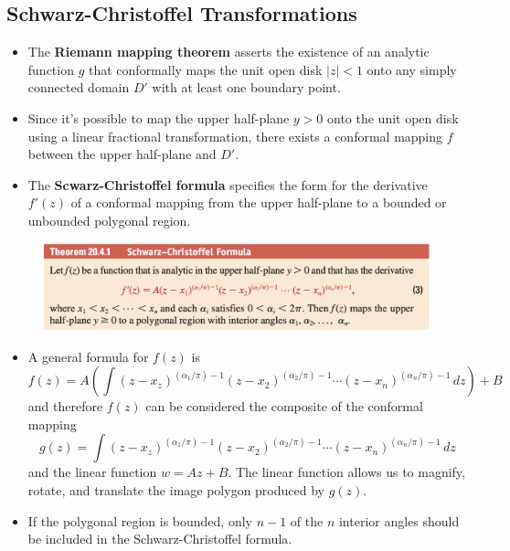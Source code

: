 \documentclass{article}
\begin{document}
\subsection{Schwarz-Christoffel Transformations}

\begin{itemize}
  \item The \textbf{Riemann mapping theorem} asserts the existence of an analytic function $g$ that conformally maps the unit open disk $|z| < 1$ onto any simply connected domain $D'$ with at least one boundary point.

  \item Since it's possible to map the upper half-plane $y > 0$ onto the unit open disk using a linear fractional transformation, there exists a conformal mapping $f$ between the upper half-plane and $D'$.

  \item The \textbf{Scwarz-Christoffel formula} specifies the form for the derivative $f'(z)$ of a conformal mapping from the upper half-plane to a bounded or unbounded polygonal region.
\end{itemize}

\begin{figure}[H]
  \centering
  \includegraphics[width=\textwidth]{schwarz-christoffel-formula}
\end{figure}

\begin{itemize}
  \item A general formula for $f(z)$ is \[f(z) = A \left( \int (z - x_z)^{(\alpha_1 / \pi) - 1} (z - x_2)^{(\alpha_2 / \pi) - 1} \cdots (z - x_n)^{(\alpha_n / \pi) - 1} \,d z \right) + B\] and therefore $f(z)$ can be considered the composite of the conformal mapping \[g(z) = \int (z - x_z)^{(\alpha_1 / \pi) - 1} (z - x_2)^{(\alpha_2 / \pi) - 1} \cdots (z - x_n)^{(\alpha_n / \pi) - 1} \,d z\] and the linear function $w = A z + B$. The linear function allows us to magnify, rotate, and translate the image polygon produced by $g(z)$.

  \item If the polygonal region is bounded, only $n - 1$ of the $n$ interior angles should be included in the Schwarz-Christoffel formula.
\end{itemize}
\end{document}
